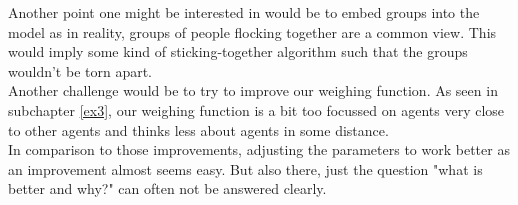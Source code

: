 Another point one might be interested in would be to embed groups into the model as in reality, groups of people flocking together are a common view. This would imply some kind of sticking-together algorithm such that the groups wouldn't be torn apart.\\
Another challenge would be to try to improve our weighing function. As seen in subchapter \ref{ex3}, our weighing function is a bit too focussed on agents very close to other agents and thinks less about agents in some distance.\\
In comparison to those improvements, adjusting the parameters to work better as an improvement almost seems easy. But also there, just the question "what is better and why?" can often not be answered clearly.\\
